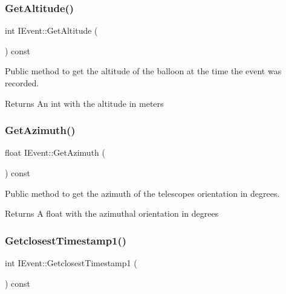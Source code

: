 \subsubsection{\texorpdfstring{Get\+Altitude()}{GetAltitude()}}
{\footnotesize\ttfamily int I\+Event\+::\+Get\+Altitude (\begin{DoxyParamCaption}{ }\end{DoxyParamCaption}) const}



Public method to get the altitude of the balloon at the time the event was recorded. 

\begin{DoxyReturn}{Returns}
An int with the altitude in meters 
\end{DoxyReturn}
\mbox{\label{classIEvent_a8ea892cd0207dd1fa3ff4a550681f323}} 
\subsubsection{\texorpdfstring{Get\+Azimuth()}{GetAzimuth()}}
{\footnotesize\ttfamily float I\+Event\+::\+Get\+Azimuth (\begin{DoxyParamCaption}{ }\end{DoxyParamCaption}) const}



Public method to get the azimuth of the telescope\textquotesingle{}s orientation in degrees. 

\begin{DoxyReturn}{Returns}
A float with the azimuthal orientation in degrees 
\end{DoxyReturn}
\mbox{\label{classIEvent_a9f7a5fc09eeed389d07f73f64d560eeb}} 
\subsubsection{\texorpdfstring{Getclosest\+Timestamp1()}{GetclosestTimestamp1()}}
{\footnotesize\ttfamily int I\+Event\+::\+Getclosest\+Timestamp1 (\begin{DoxyParamCaption}{ }\end{DoxyParamCaption}) const}



